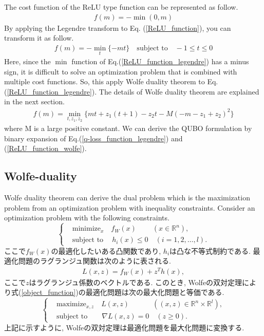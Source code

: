 \documentclass[fp,twocolumn]{jpsj3}
\begin{document}
The cost function of the ReLU type function can be represented as follow.
\begin{eqnarray}
  f(m)=-\min{(0,m)} \label{ReLU_function}
\end{eqnarray}
By applying the Legendre transform to Eq. (\ref{ReLU_function}), you can transform it as follow.
\begin{eqnarray}
  f(m)=-\min_{t}{\{-mt\}} \quad \text{subject to} \quad -1\leq t\leq 0 \label{ReLU_function_legendre}
\end{eqnarray}
Here, since the $\min$ function of Eq.(\ref{ReLU_function_legendre}) has a minus sign, it is difficult to solve an optimization problem that is combined with multiple cost functions. So, this apply Wolfe duality theorem to Eq.(\ref{ReLU_function_legendre}). The details of Wolfe duality theorem are explained in the next section.
\begin{eqnarray}
  f(m)=\min_{t,z_{1},z_{2}}{\{mt+z_{1}(t+1)-z_{2}t-M(-m-z_{1}+z_{2})^{2}\}} \label{ReLU_function_wolfe}
\end{eqnarray}
where M is a large positive constant. We can derive the QUBO formulation by binary expansion of Eq.(\ref{q-loss_function_legendre}) and (\ref{ReLU_function_wolfe}).

\subsection{Wolfe-duality} \label{sec:wolfe}
Wolfe duality theorem can derive the dual problem which is the maximization problem from an optimization problem with inequality constraints. Consider an optimization problem with the following constraints.
\begin{equation}
  \left\{
  \begin{aligned}
    & \text{minimize}_{x}  \quad  f_{W}(x) \quad \quad \ (x\in\mathbb{R}^{n}),\\
    & \text{subject to}  \ \quad h_{i}(x)\leq 0 \quad (i=1,2,\dots,l). \label{object_function}
  \end{aligned}
  \right.
\end{equation}
ここで$f_{W}(x)$の最適化したいある凸関数であり, $h_{i}$は凸な不等式制約である. 最適化問題のラグランジュ関数は次のように表される.
\begin{eqnarray}
  L(x,z)=f_{W}(x)+z^{T}h(x),
\end{eqnarray}
ここで$z$はラグランジュ係数のベクトルである. このとき, Wolfeの双対定理により式(\ref{object_function})の最適化問題は次の最大化問題と等価である.
\begin{equation}
  \left\{
  \begin{aligned}
    & \text{maximize}_{x,z}  \quad L(x,z) \quad \quad \quad \ ((x,z)\in \mathbb{R}^{n}\times\mathbb{R}^{l}),\\
    & \text{subject to}  \qquad \nabla L(x,z)=0 \quad (z \geq 0).
  \end{aligned}
  \right.
\end{equation}
上記に示すように, Wolfeの双対定理は最適化問題を最大化問題に変換する. 
\end{document}
